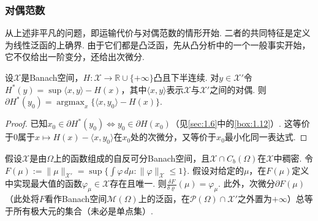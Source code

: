 \subsubsection{对偶范数}\label{sec:7.2.1}
从上述非平凡的问题，即运输代价与对偶范数的情形开始. 二者的共同特征是定义为线性泛函的上确界. 由于它们都是凸泛函，先从凸分析中的一个一般事实开始，它不仅给出一阶变分，还给出次微分.
\begin{lemma}\label{obj:7.15}
设$\mathscr X$是Banach空间，$H:\mathscr X\to\mathbb R\cup\{+\infty\}$凸且下半连续. 对$y\in\mathscr X'$令$H^*(y)=\sup\langle x,y\rangle-H(x)$，其中$\langle x,y\rangle$表示$\mathscr X$与$\mathscr X'$之间的对偶. 则$\partial H^*(y_0)=\operatorname*{argmax}_x\{\langle x,y_0\rangle-H(x)\}$.
\end{lemma}
\begin{proof}
已知$x_0\in\partial H^*(y_0)\Longleftrightarrow y_0\in\partial H(x_0)$（见\autoref{sec:1.6}中的\autoref{box:1.12}）. 这等价于$0$属于$x\mapsto H(x)-\langle x,y_0\rangle$在$x_0$处的次微分，又等价于$x_0$最小化同一表达式.
\end{proof}
\begin{proposition}\label{obj:7.16}
假设$\mathscr X$是由$\Omega$上的函数组成的自反可分Banach空间，且$\mathscr X\cap C_b(\Omega)$在$\mathscr X$中稠密. 令$F(\mu):=\|\mu\|_{\mathscr X'}=\sup\{\int\varphi\,d\mu:\|\varphi\|_{\mathscr X}\leq1\}$. 假设对给定的$\mu$，在$F(\mu)$定义中实现最大值的函数$\varphi_\mu\in\mathscr X$存在且唯一. 则$\frac{\delta F}{\delta\varrho}(\mu)=\varphi_\mu$. 此外，次微分$\partial F(\mu)$（此处将$F$看作Banach空间$\mathscr M(\Omega)$上的泛函，在$\mathscr P(\Omega)\cap\mathscr X'$之外置为$+\infty$）总等于所有极大元的集合（未必是单点集）.
\end{proposition}
